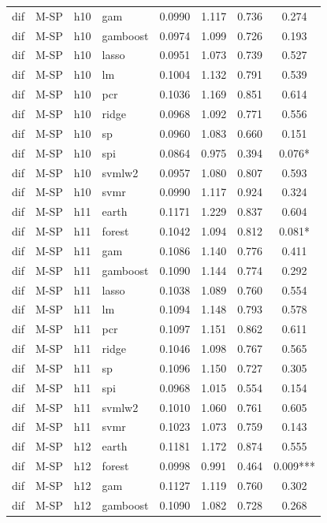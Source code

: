 \begin{ThreePartTable}
\begin{longtable}[t]{llclcccc}
dif & M-SP & h10 & gam & 0.0990 & 1.117 & 0.736 & 0.274\\
dif & M-SP & h10 & gamboost & 0.0974 & 1.099 & 0.726 & 0.193\\
dif & M-SP & h10 & lasso & 0.0951 & 1.073 & 0.739 & 0.527\\
dif & M-SP & h10 & lm & 0.1004 & 1.132 & 0.791 & 0.539\\
dif & M-SP & h10 & pcr & 0.1036 & 1.169 & 0.851 & 0.614\\
dif & M-SP & h10 & ridge & 0.0968 & 1.092 & 0.771 & 0.556\\
dif & M-SP & h10 & sp & 0.0960 & 1.083 & 0.660 & 0.151\\
dif & M-SP & h10 & spi & 0.0864 & 0.975 & 0.394 & 0.076*\\
dif & M-SP & h10 & svmlw2 & 0.0957 & 1.080 & 0.807 & 0.593\\
dif & M-SP & h10 & svmr & 0.0990 & 1.117 & 0.924 & 0.324\\
\addlinespace
dif & M-SP & h11 & earth & 0.1171 & 1.229 & 0.837 & 0.604\\
dif & M-SP & h11 & forest & 0.1042 & 1.094 & 0.812 & 0.081*\\
dif & M-SP & h11 & gam & 0.1086 & 1.140 & 0.776 & 0.411\\
dif & M-SP & h11 & gamboost & 0.1090 & 1.144 & 0.774 & 0.292\\
dif & M-SP & h11 & lasso & 0.1038 & 1.089 & 0.760 & 0.554\\
dif & M-SP & h11 & lm & 0.1094 & 1.148 & 0.793 & 0.578\\
dif & M-SP & h11 & pcr & 0.1097 & 1.151 & 0.862 & 0.611\\
dif & M-SP & h11 & ridge & 0.1046 & 1.098 & 0.767 & 0.565\\
dif & M-SP & h11 & sp & 0.1096 & 1.150 & 0.727 & 0.305\\
dif & M-SP & h11 & spi & 0.0968 & 1.015 & 0.554 & 0.154\\
dif & M-SP & h11 & svmlw2 & 0.1010 & 1.060 & 0.761 & 0.605\\
dif & M-SP & h11 & svmr & 0.1023 & 1.073 & 0.759 & 0.143\\
\addlinespace
dif & M-SP & h12 & earth & 0.1181 & 1.172 & 0.874 & 0.555\\
dif & M-SP & h12 & forest & 0.0998 & 0.991 & 0.464 & 0.009***\\
dif & M-SP & h12 & gam & 0.1127 & 1.119 & 0.760 & 0.302\\
dif & M-SP & h12 & gamboost & 0.1090 & 1.082 & 0.728 & 0.268\\

\end{longtable}
\end{ThreePartTable}
